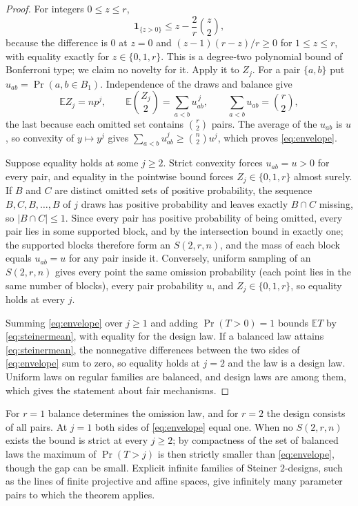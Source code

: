 \documentclass[11pt,a4paper]{article}
\theoremstyle{remark}
\newcommand{\E}{\mathbb E}
\newcommand{\ind}{\mathbf 1}
\begin{document}
\begin{proof}
For integers $0\le z\le r$,
\[
 \ind_{\{z>0\}}\le z-\frac2r\binom z2 ,
\]
because the difference is $0$ at $z=0$ and $(z-1)(r-z)/r\ge0$ for $1\le z\le r$, with equality exactly for $z\in\{0,1,r\}$. This is a degree-two polynomial bound of Bonferroni type; we claim no novelty for it. Apply it to $Z_j$. For a pair $\{a,b\}$ put $u_{ab}=\Pr(a,b\in B_1)$. Independence of the draws and balance give
\[
 \E Z_j=np^j,\qquad \E\binom{Z_j}{2}=\sum_{a<b}u_{ab}^{\,j},\qquad \sum_{a<b}u_{ab}=\binom r2,
\]
the last because each omitted set contains $\binom r2$ pairs. The average of the $u_{ab}$ is $u$, so convexity of $y\mapsto y^j$ gives $\sum_{a<b}u_{ab}^j\ge\binom n2u^j$, which proves \eqref{eq:envelope}.

Suppose equality holds at some $j\ge2$. Strict convexity forces $u_{ab}=u>0$ for every pair, and equality in the pointwise bound forces $Z_j\in\{0,1,r\}$ almost surely. If $B$ and $C$ are distinct omitted sets of positive probability, the sequence $B,C,B,\dots,B$ of $j$ draws has positive probability and leaves exactly $B\cap C$ missing, so $|B\cap C|\le1$. Since every pair has positive probability of being omitted, every pair lies in some supported block, and by the intersection bound in exactly one; the supported blocks therefore form an $S(2,r,n)$, and the mass of each block equals $u_{ab}=u$ for any pair inside it. Conversely, uniform sampling of an $S(2,r,n)$ gives every point the same omission probability (each point lies in the same number of blocks), every pair probability $u$, and $Z_j\in\{0,1,r\}$, so equality holds at every $j$.

Summing \eqref{eq:envelope} over $j\ge1$ and adding $\Pr(T>0)=1$ bounds $\E T$ by \eqref{eq:steinermean}, with equality for the design law. If a balanced law attains \eqref{eq:steinermean}, the nonnegative differences between the two sides of \eqref{eq:envelope} sum to zero, so equality holds at $j=2$ and the law is a design law. Uniform laws on regular families are balanced, and design laws are among them, which gives the statement about fair mechanisms.
\end{proof}

For $r=1$ balance determines the omission law, and for $r=2$ the design consists of all pairs. At $j=1$ both sides of \eqref{eq:envelope} equal one. When no $S(2,r,n)$ exists the bound is strict at every $j\ge2$; by compactness of the set of balanced laws the maximum of $\Pr(T>j)$ is then strictly smaller than \eqref{eq:envelope}, though the gap can be small. Explicit infinite families of Steiner $2$-designs, such as the lines of finite projective and affine spaces, give infinitely many parameter pairs to which the theorem applies.
\end{document}

